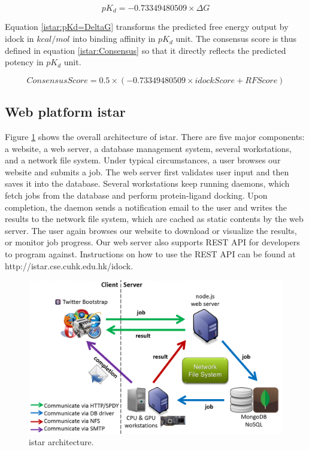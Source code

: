\begin{equation}
\label{istar:pKd=DeltaG}
pK_d = -0.73349480509 \times \Delta G
\end{equation}

Equation \eqref{istar:pKd=DeltaG} transforms the predicted free energy output by idock in $kcal/mol$ into binding affinity in $pK_d$ unit. The consensus score is thus defined in equation \eqref{istar:Consensus} so that it directly reflects the predicted potency in $pK_d$ unit.

\begin{equation}
\label{istar:Consensus}
ConsensusScore = 0.5 \times (-0.73349480509 \times idockScore + RFScore)
\end{equation}

\subsection{Web platform istar}

Figure \ref{istar:Architecture} shows the overall architecture of istar. There are five major components: a website, a web server, a database management system, several workstations, and a network file system. Under typical circumstances, a user browses our website and submits a job. The web server first validates user input and then saves it into the database. Several workstations keep running daemons, which fetch jobs from the database and perform protein-ligand docking. Upon completion, the daemon sends a notification email to the user and writes the results to the network file system, which are cached as static contents by the web server. The user again browses our website to download or visualize the results, or monitor job progress. Our web server also supports REST API for developers to program against. Instructions on how to use the REST API can be found at http://istar.cse.cuhk.edu.hk/idock.

\begin{figure}
\centering
\includegraphics[width=\linewidth]{../istar/Architecture.png}
\caption{istar architecture.}
\label{istar:Architecture}
\end{figure}


